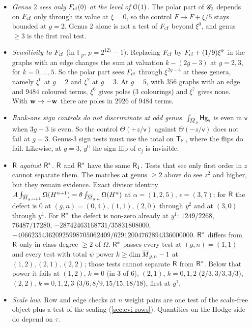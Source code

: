 \begin{itemize}
\item \emph{Genus $2$ sees only $F_{\mathrm{cf}}(0)$ at the level of $\mathcal{O}(1)$.} The polar part of $\mathscr{G}_2$ depends on $F_{\mathrm{cf}}$ only through its value at $\xi=0$, so the control $F\to F+\xi/5$ stays bounded at $g=2$. Genus $2$ alone is not a test of $F_{\mathrm{cf}}$ beyond $\xi^0$, and genus $\geq 3$ is the first real test.
\item \emph{Sensitivity to $F_{\mathrm{cf}}$} (in $\mathbb{F}_p$, $p=2^{127}-1$). Replacing $F_{\mathrm{cf}}$ by $F_{\mathrm{cf}}+(1/9)\xi^k$ in the graphs with an edge changes the sum at valuation $k-(2g-3)$ at $g=2,3$, for $k=0,\dots,5$. So the polar part sees $F_{\mathrm{cf}}$ through $\xi^{2g-4}$ at these genera, namely $\xi^0$ at $g=2$ and $\xi^2$ at $g=3$. At $g=5$, with $356$ graphs with an edge and $9484$ coloured terms, $\xi^6$ gives poles ($3$ colourings) and $\xi^7$ gives none. With $\mathbf{w}\to-\mathbf{w}$ there are poles in $2926$ of $9484$ terms.
\item \emph{Rank-one sign controls do not discriminate at odd genus.} $\int_{\overline{M}_g}\mathsf{Hg}_{\mathsf{v}}$ is even in $\mathsf{v}$ when $3g-3$ is even. So the control $\Theta(+z/\mathsf{v})$ against $\Theta(-z/\mathsf{v})$ does not fail at $g=3$. Genus-$3$ sign tests must use the total on $\mathsf{T}_{\mathrm{F}}$, where the flips do fail. Likewise, at $g=3$, $y^0$ the sign flip of $c_j$ is invisible.
\item \emph{$\mathsf{R}$ against $\mathsf{R}^*$.} $\mathsf{R}$ and $\mathsf{R}^*$ have the same $\mathsf{R}_1$. Tests that see only first order in $z$ cannot separate them. The matches at genus $\geq 2$ above do see $z^2$ and higher, but they remain evidence. Exact divisor identity $A\int_{\overline{M}_{g,n+1}}\Omega(H^{n+1})=\theta\int_{\overline{M}_{g,n}}\Omega(H^n)$ at $\alpha=(1,2,5)$, $\epsilon=(3,7)$: for $\mathsf{R}$ the defect is $0$ at $(g,n)=(0,4),(1,1),(2,0)$ through $y^2$ and at $(3,0)$ through $y^1$. For $\mathsf{R}^*$ the defect is non-zero already at $y^1$: $1249/2268$, $76487/17280$, $-28742463168731/35831808000$, $-406623543620925998705062409/62912004762894336000000$. $\mathsf{R}^*$ differs from $\mathsf{R}$ only in class degree $\geq 2$ of $\Omega$. $\mathsf{R}^*$ passes every test at $(g,n)=(1,1)$ and every test with total $\psi$ power $k\geq\dim\overline{M}_{g,n}-1$ at $(1,2),(2,1),(2,2)$; those tests cannot separate $\mathsf{R}$ from $\mathsf{R}^*$. Below that power it fails at $(1,2)$, $k=0$ (in $3$ of $6$), $(2,1)$, $k=0,1,2$ ($2/3,3/3,3/3$), $(2,2)$, $k=0,1,2,3$ ($3/6,8/9,15/15,18/18$), first at $y^1$.
\item \emph{Scale law.} Row and edge checks at $n$ weight pairs are one test of the scale-free object plus a test of the scaling (\cref{sec:evi-rows}). Quantities on the Hodge side do depend on $\tau$.

\end{itemize}
